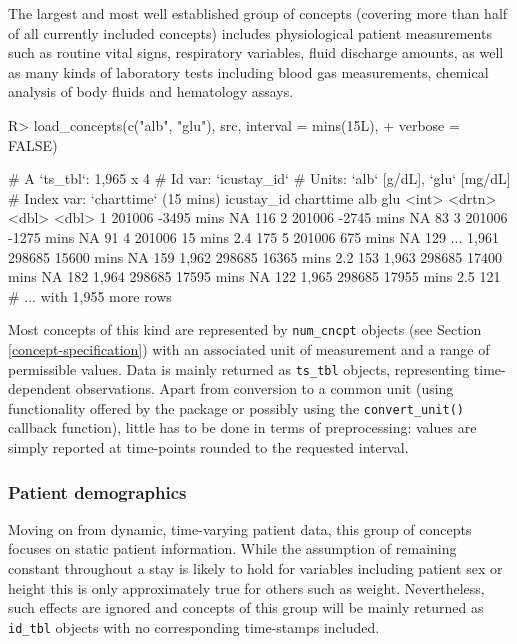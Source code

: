 \documentclass[
  notitle,
  nojss,
  noheadings]{jss}
\begin{document}
The largest and most well established group of concepts (covering more
than half of all currently included concepts) includes physiological
patient measurements such as routine vital signs, respiratory variables,
fluid discharge amounts, as well as many kinds of laboratory tests
including blood gas measurements, chemical analysis of body fluids and
hematology assays.

\begin{CodeChunk}
\begin{CodeInput}
R> load_concepts(c("alb", "glu"), src, interval = mins(15L),
+               verbose = FALSE)
\end{CodeInput}
\begin{CodeOutput}
# A `ts_tbl`: 1,965 x 4
# Id var:     `icustay_id`
# Units:      `alb` [g/dL], `glu` [mg/dL]
# Index var:  `charttime` (15 mins)
      icustay_id charttime    alb   glu
           <int> <drtn>     <dbl> <dbl>
    1     201006 -3495 mins  NA     116
    2     201006 -2745 mins  NA      83
    3     201006 -1275 mins  NA      91
    4     201006    15 mins   2.4   175
    5     201006   675 mins  NA     129
  ...
1,961     298685 15600 mins  NA     159
1,962     298685 16365 mins   2.2   153
1,963     298685 17400 mins  NA     182
1,964     298685 17595 mins  NA     122
1,965     298685 17955 mins   2.5   121
# ... with 1,955 more rows
\end{CodeOutput}
\end{CodeChunk}

Most concepts of this kind are represented by \texttt{num\_cncpt}
objects (see Section \ref{concept-specification}) with an associated
unit of measurement and a range of permissible values. Data is mainly
returned as \texttt{ts\_tbl} objects, representing time-dependent
observations. Apart from conversion to a common unit (using
functionality offered by the  package \citep{pebesma2016} or
possibly using the \texttt{convert\_unit()} callback function), little
has to be done in terms of preprocessing: values are simply reported at
time-points rounded to the requested interval.

\hypertarget{patient-demographics}{%
\subsubsection{Patient demographics}\label{patient-demographics}}

Moving on from dynamic, time-varying patient data, this group of
concepts focuses on static patient information. While the assumption of
remaining constant throughout a stay is likely to hold for variables
including patient sex or height this is only approximately true for
others such as weight. Nevertheless, such effects are ignored and
concepts of this group will be mainly returned as \texttt{id\_tbl}
objects with no corresponding time-stamps included.
\end{document}
